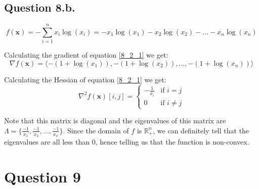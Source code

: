 \documentclass{article}
\begin{document}
\subsection*{Question 8.b.}
\begin{flushleft}
\begin{equation}
\label{8_2_1}
f(\mathbf{x}) = \displaystyle - \sum_{i=1}^{n} x_{i} \log(x_{i}) = -x_{1}\log(x_{1}) -x_{2}\log(x_{2}) -\ldots -x_{n}\log(x_{n})
\end{equation}

Calculating the gradient of equation \ref{8_2_1} we get:
\begin{equation}
\nabla f(\mathbf{x}) = \langle -(1 + \log(x_{1})), -(1 + \log(x_{2})), \ldots, -(1 + \log(x_{n})) \rangle
\end{equation}

Calculating the Hessian of equation \ref{8_2_1} we get:
\begin{equation}
\displaystyle \nabla^{2} f(\mathbf{x}) [i,j] = \begin{cases}
-\frac{1}{x_{i}} & \text{if } i = j \\
0 & \text{if } i \neq j
\end{cases}
\end{equation}

Note that this matrix is diagonal and the eigenvalues of this matrix are \(\Lambda = \lbrace\frac{-1}{x_1}, \frac{-1}{x_2}, \ldots, \frac{-1}{x_n}\rbrace\). Since the domain of \(f\) is \(\mathbb{R}^{n}_{+}\), we can definitely tell that the eigenvalues are all less than \(0\), hence telling us that the function is non-convex.
\end{flushleft}
\section*{Question 9}
\end{document}
